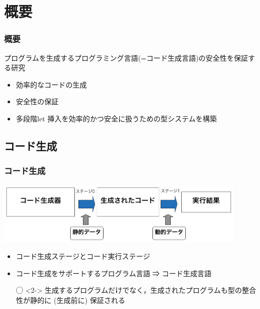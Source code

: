 
\section{概要}

\begin{frame}
  \frametitle{概要}
  プログラムを生成するプログラミング言語(=\alert{コード生成言語})の安全性を保証する研究
  \begin{itemize}
  \item<2-> 効率的なコードの生成
  \item<2-> 安全性の保証
  \item<3-> [⇒] \alert{多段階let 挿入}を効率的かつ安全に扱うための型システムを構築
  \end{itemize}
\end{frame}

\subsection{コード生成}
\begin{frame}
  \frametitle{コード生成}
  \includegraphics[clip,width=12cm]{./img/prggen.png}
  \begin{itemize}
  \item コード生成ステージとコード実行ステージ
  \item コード生成をサポートするプログラム言語 ⇒ コード生成言語
  \item[◯]<2-> 生成するプログラムだけでなく，生成されたプログラムも型の整合性が静的に (生成前に) 保証される
  \end{itemize}
\end{frame}

